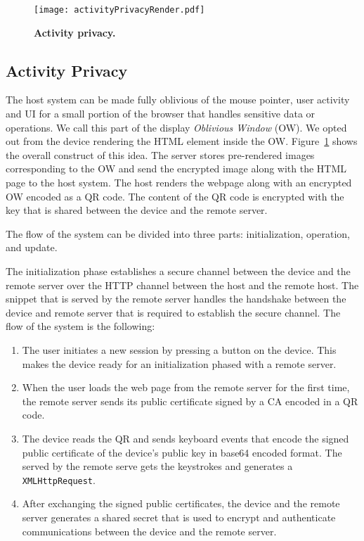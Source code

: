 \begin{figure}[h]
\centering
\texttt{[image: activityPrivacyRender.pdf]}
\caption{\textbf{Activity privacy.}}
\label{fig:activityPrivacy}
\centering
\end{figure}


\subsection{Activity Privacy}
\label{sec:systemDesign:mousePrivacy}

The host system can be made fully oblivious of the mouse pointer, user activity and UI for a small portion of the browser that handles sensitive data or operations. We call this part of the display \emph{Oblivious Window} (OW). We opted out from the device rendering the HTML element inside the OW. Figure~\ref{fig:activityPrivacy} shows the overall construct of this idea. The server stores pre-rendered images corresponding to the OW and send the encrypted image along with the HTML page to the host system. The host renders the webpage along with an encrypted OW encoded as a QR code. The content of the QR code is encrypted with the \tls key that is shared between the device and the remote server.

The flow of the system can be divided into three parts: initialization, operation, and update.

 The initialization phase establishes a secure channel between the device and the remote server over the HTTP channel between the host and the remote host. The \js snippet that is served by the remote server handles the handshake between the device and remote server that is required to establish the secure channel. The flow of the system is the following: 
\begin{enumerate}
  \item The user initiates a new session by pressing a button on the device. This makes the device ready for an initialization phased with a remote server.
  \item When the user loads the web page from the remote server for the first time, the remote server sends its public certificate signed by a CA encoded in a QR code. 
  \item The device reads the QR and sends keyboard events that encode the signed public certificate of the device's public key in base64 encoded format. The \js served by the remote serve gets the keystrokes and generates a \texttt{XMLHttpRequest}.
  \item After exchanging the signed public certificates, the device and the remote server generates a shared secret that is used to encrypt and authenticate communications between the device and the remote server.
\end{enumerate}


